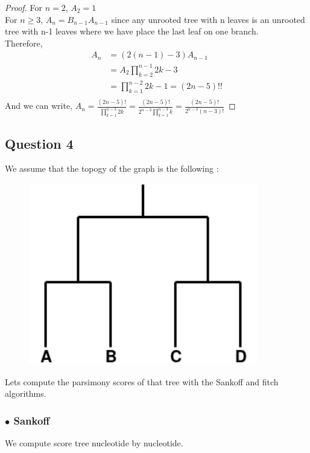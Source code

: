 \documentclass[]{article}
\theoremstyle{definition}
\begin{document}
\begin{proof}For $n=2$, $A_{2} = 1$\\
For $n\geq 3$, $A_{n} = B_{n-1}A_{n-1}$ since any unrooted tree with n leaves is an unrooted tree with n-1 leaves where we have place the last leaf on one branch.\\
Therefore, 
\begin{align*}
A_{n} &= (2(n-1)-3)A_{n-1}\\
&= A_{2}{\displaystyle{\prod_{k=2}^{n-1} 2k - 3}}\\
&= {\displaystyle \prod_{k=1}^{n-2} 2k - 1} = (2n-5)!!\\
\end{align*}
And we can write,
$
A_{n} = \frac{(2n - 5)!}{\displaystyle \prod_{k=1}^{n-3} 2k}
=  \frac{(2n - 5)!}{2^{n-3}\displaystyle \prod_{k=1}^{n-3}k}
= \frac{(2n - 5)!}{2^{n-3}(n-3)!}
$
\end{proof}
\newpage
\subsection{Question 4}
We assume that the topogy of the graph is the following :

\begin{figure}[h!]
	\includegraphics*[width = 10cm]{image/topology.png}
\end{figure}

Lets compute the parsimony scores of that tree with the Sankoff and fitch algorithms.

\subsubsection*{$\bullet$ Sankoff }
We compute score tree nucleotide by nucleotide.
\end{document}
